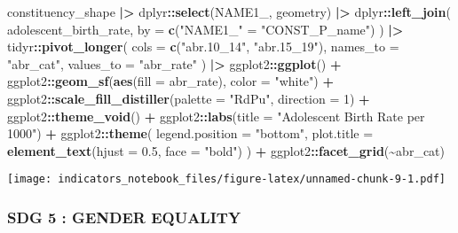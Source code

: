 \documentclass[
]{article}
\newenvironment{Shaded}{\begin{snugshade}}{\end{snugshade}}
\newcommand{\AttributeTok}[1]{\textcolor[rgb]{0.13,0.29,0.53}{#1}}
\newcommand{\DecValTok}[1]{\textcolor[rgb]{0.00,0.00,0.81}{#1}}
\newcommand{\FloatTok}[1]{\textcolor[rgb]{0.00,0.00,0.81}{#1}}
\newcommand{\FunctionTok}[1]{\textcolor[rgb]{0.13,0.29,0.53}{\textbf{#1}}}
\newcommand{\NormalTok}[1]{#1}
\newcommand{\OtherTok}[1]{\textcolor[rgb]{0.56,0.35,0.01}{#1}}
\newcommand{\SpecialCharTok}[1]{\textcolor[rgb]{0.81,0.36,0.00}{\textbf{#1}}}
\newcommand{\StringTok}[1]{\textcolor[rgb]{0.31,0.60,0.02}{#1}}
\begin{document}
\begin{Shaded}
\begin{Highlighting}[]
\NormalTok{constituency\_shape }\SpecialCharTok{|\textgreater{}}
\NormalTok{  dplyr}\SpecialCharTok{::}\FunctionTok{select}\NormalTok{(NAME1\_, geometry) }\SpecialCharTok{|\textgreater{}}
\NormalTok{  dplyr}\SpecialCharTok{::}\FunctionTok{left\_join}\NormalTok{(}
\NormalTok{    adolescent\_birth\_rate,}
    \AttributeTok{by =} \FunctionTok{c}\NormalTok{(}\StringTok{"NAME1\_"} \OtherTok{=} \StringTok{"CONST\_P\_name"}\NormalTok{)}
\NormalTok{  ) }\SpecialCharTok{|\textgreater{}}
\NormalTok{  tidyr}\SpecialCharTok{::}\FunctionTok{pivot\_longer}\NormalTok{(}
    \AttributeTok{cols =} \FunctionTok{c}\NormalTok{(}\StringTok{"abr.10\_14"}\NormalTok{, }\StringTok{"abr.15\_19"}\NormalTok{),}
    \AttributeTok{names\_to =} \StringTok{"abr\_cat"}\NormalTok{,}
    \AttributeTok{values\_to =} \StringTok{"abr\_rate"}
\NormalTok{  ) }\SpecialCharTok{|\textgreater{}}
\NormalTok{  ggplot2}\SpecialCharTok{::}\FunctionTok{ggplot}\NormalTok{() }\SpecialCharTok{+}
\NormalTok{  ggplot2}\SpecialCharTok{::}\FunctionTok{geom\_sf}\NormalTok{(}\FunctionTok{aes}\NormalTok{(}\AttributeTok{fill =}\NormalTok{ abr\_rate), }\AttributeTok{color =} \StringTok{"white"}\NormalTok{) }\SpecialCharTok{+}
\NormalTok{  ggplot2}\SpecialCharTok{::}\FunctionTok{scale\_fill\_distiller}\NormalTok{(}\AttributeTok{palette =} \StringTok{"RdPu"}\NormalTok{, }\AttributeTok{direction =} \DecValTok{1}\NormalTok{) }\SpecialCharTok{+}
\NormalTok{  ggplot2}\SpecialCharTok{::}\FunctionTok{theme\_void}\NormalTok{() }\SpecialCharTok{+}
\NormalTok{  ggplot2}\SpecialCharTok{::}\FunctionTok{labs}\NormalTok{(}\AttributeTok{title =} \StringTok{"Adolescent Birth Rate per 1000"}\NormalTok{) }\SpecialCharTok{+}
\NormalTok{  ggplot2}\SpecialCharTok{::}\FunctionTok{theme}\NormalTok{(}
    \AttributeTok{legend.position =} \StringTok{"bottom"}\NormalTok{,}
    \AttributeTok{plot.title =} \FunctionTok{element\_text}\NormalTok{(}\AttributeTok{hjust =} \FloatTok{0.5}\NormalTok{, }\AttributeTok{face =} \StringTok{"bold"}\NormalTok{)}
\NormalTok{  ) }\SpecialCharTok{+}
\NormalTok{  ggplot2}\SpecialCharTok{::}\FunctionTok{facet\_grid}\NormalTok{(}\SpecialCharTok{\textasciitilde{}}\NormalTok{abr\_cat)}
\end{Highlighting}
\end{Shaded}

\texttt{[image: indicators\_notebook\_files/figure-latex/unnamed-chunk-9-1.pdf]}

\subsubsection{SDG 5 : GENDER EQUALITY}\label{sdg-5-gender-equality}
\end{document}
